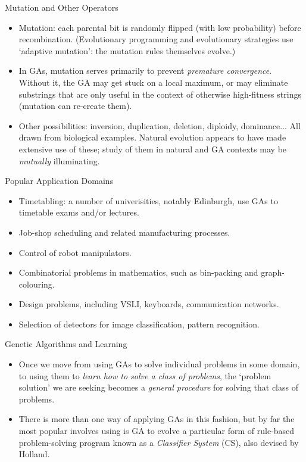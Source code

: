\documentclass{article}
\begin{document}
\begin{slide}{}
{\Large Mutation and Other Operators}
\begin{itemize} 
\item Mutation: each parental bit 
is randomly flipped (with low probability) before
recombination. (Evolutionary programming and evolutionary strategies
use `adaptive mutation': the mutation rules themselves evolve.) 
\item In
GAs, mutation serves primarily to prevent {\em
premature convergence}. Without it, the GA
may get stuck on a local maximum, or may
eliminate substrings that are only useful in the context of otherwise
high-fitness strings (mutation can re-create them).
\item Other possibilities: inversion, duplication,
deletion, diploidy, dominance... All drawn from biological
examples. Natural evolution appears to have made extensive use of
these; study of them in natural and GA contexts may be {\em mutually}
illuminating.
\end{itemize}
\end{slide}

\begin{slide}{}
{\Large Popular Application Domains}
\begin{itemize}
\item Timetabling: a number of univerisities, notably Edinburgh, use
GAs to timetable exams and/or lectures.
\item Job-shop scheduling and related manufacturing processes.
\item Control of robot manipulators.
\item Combinatorial problems in mathematics, such as bin-packing and
graph-colouring.
\item Design problems, including VSLI, keyboards, communication
networks.
\item Selection of detectors for image classification, pattern recognition.
\end{itemize}
\end{slide}

\begin{slide}{}
{\Large Genetic Algorithms and Learning}
\begin{itemize}
\item Once we move from using GAs to solve individual problems in
some domain, to using them to {\em learn how to solve a class of
problems}, the `problem solution' we are seeking becomes a {\em
general procedure} for solving that class of problems. 
\item There is more
than one way of applying GAs in this fashion, but by far the most
popular involves using is GA to evolve a particular form of rule-based
problem-solving program known as a {\em Classifier System} (CS), also
devised by Holland.
\end{itemize}
\end{slide}
\end{document}
